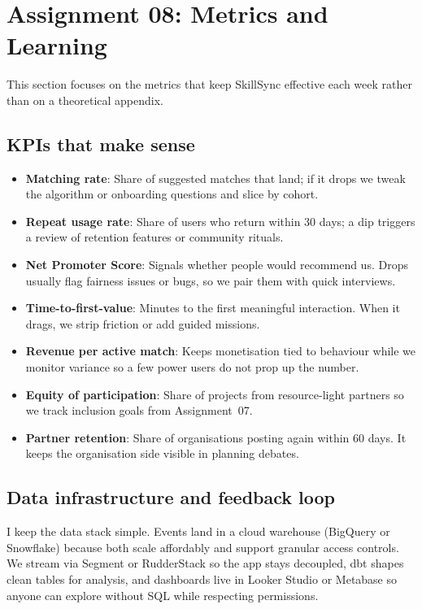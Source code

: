 \section*{Assignment 08: Metrics and Learning}

This section focuses on the metrics that keep SkillSync effective each week rather than on a theoretical appendix.

\subsection*{KPIs that make sense}
\begin{itemize}
    \item \textbf{Matching rate}: Share of suggested matches that land; if it drops we tweak the algorithm or onboarding questions and slice by cohort.
    \item \textbf{Repeat usage rate}: Share of users who return within 30 days; a dip triggers a review of retention features or community rituals.
    \item \textbf{Net Promoter Score}: Signals whether people would recommend us. Drops usually flag fairness issues or bugs, so we pair them with quick interviews.
    \item \textbf{Time-to-first-value}: Minutes to the first meaningful interaction. When it drags, we strip friction or add guided missions.
    \item \textbf{Revenue per active match}: Keeps monetisation tied to behaviour while we monitor variance so a few power users do not prop up the number.
    \item \textbf{Equity of participation}: Share of projects from resource-light partners so we track inclusion goals from Assignment~07.
    \item \textbf{Partner retention}: Share of organisations posting again within 60 days. It keeps the organisation side visible in planning debates.
\end{itemize}

\subsection*{Data infrastructure and feedback loop}
I keep the data stack simple. Events land in a cloud warehouse (BigQuery or Snowflake) because both scale affordably and support granular access controls. We stream via Segment or RudderStack so the app stays decoupled, dbt shapes clean tables for analysis, and dashboards live in Looker Studio or Metabase so anyone can explore without SQL while respecting permissions.

